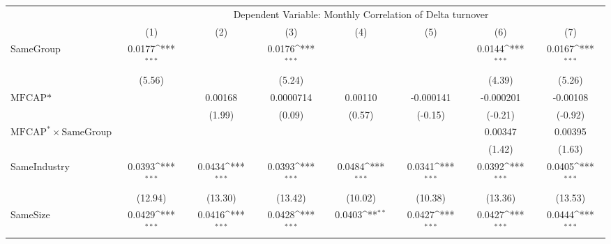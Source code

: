 {
\def\sym#1{\ifmmode^{#1}\else\(^{#1}\)\fi}
\begin{tabular}{l*{7}{c}}
\hline\hline
                    &\multicolumn{7}{c}{Dependent Variable:  Monthly Correlation of Delta turnover}                                                                           \\\cmidrule(lr){2-8}
                    &\multicolumn{1}{c}{(1)}         &\multicolumn{1}{c}{(2)}         &\multicolumn{1}{c}{(3)}         &\multicolumn{1}{c}{(4)}         &\multicolumn{1}{c}{(5)}         &\multicolumn{1}{c}{(6)}         &\multicolumn{1}{c}{(7)}         \\
\hline
SameGroup           &      0.0177\sym{***}&                     &      0.0176\sym{***}&                     &                     &      0.0144\sym{***}&      0.0167\sym{***}\\
                    &      (5.56)         &                     &      (5.24)         &                     &                     &      (4.39)         &      (5.26)         \\
[1em]
$ \text{MFCAP*} $   &                     &     0.00168         &   0.0000714         &     0.00110         &   -0.000141         &   -0.000201         &    -0.00108         \\
                    &                     &      (1.99)         &      (0.09)         &      (0.57)         &     (-0.15)         &     (-0.21)         &     (-0.92)         \\
[1em]
 $ \text{MFCAP}^* \times {\text{SameGroup} }  $ &                     &                     &                     &                     &                     &     0.00347         &     0.00395         \\
                    &                     &                     &                     &                     &                     &      (1.42)         &      (1.63)         \\
[1em]
SameIndustry        &      0.0393\sym{***}&      0.0434\sym{***}&      0.0393\sym{***}&      0.0484\sym{***}&      0.0341\sym{***}&      0.0392\sym{***}&      0.0405\sym{***}\\
                    &     (12.94)         &     (13.30)         &     (13.42)         &     (10.02)         &     (10.38)         &     (13.36)         &     (13.53)         \\
[1em]
SameSize            &      0.0429\sym{***}&      0.0416\sym{***}&      0.0428\sym{***}&      0.0403\sym{**} &      0.0427\sym{***}&      0.0427\sym{***}&      0.0444\sym{***}\\

\end{tabular}}
